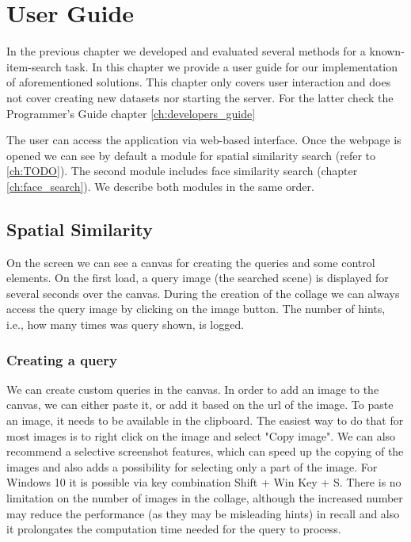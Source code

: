 \chapter{User Guide}
\label{ch:user_guide}


In the previous chapter we developed and evaluated several methods for a known-item-search task. In this chapter we provide a user guide for our implementation of aforementioned solutions. This chapter only covers user interaction and does not cover creating new datasets nor starting the server. For the latter check the Programmer's Guide chapter \ref{ch:developers_guide}

The user can access the application via web-based interface. Once the webpage is opened we can see by default a module for spatial similarity search (refer to \ref{ch:TODO}). \todo{} The second module includes face similarity search (chapter \ref{ch:face_search}). We describe both modules in the same order.

\section{Spatial Similarity}

On the screen we can see a canvas for creating the queries and some control elements. On the first load, a query image (the searched scene) is displayed for several seconds over the canvas. During the creation of the collage we can always access the query image by clicking on the image button. The number of hints, i.e., how many times was query shown, is logged. 



\subsection*{Creating a query}

We can create custom queries in the canvas. In order to add an image to the canvas, we can either paste it, or add it based on the url of the image. To paste an image, it needs to be available in the clipboard. The easiest way to do that for most images is to right click on the image and select "Copy image". We can also recommend a selective screenshot features, which can speed up the copying of the images and also adds a possibility for selecting only a part of the image. For Windows 10 it is possible via key combination Shift + Win Key + S. There is no limitation on the number of images in the collage, although the increased number may reduce the performance (as they may be misleading hints) in recall and also it prolongates the computation time needed for the query to process.


